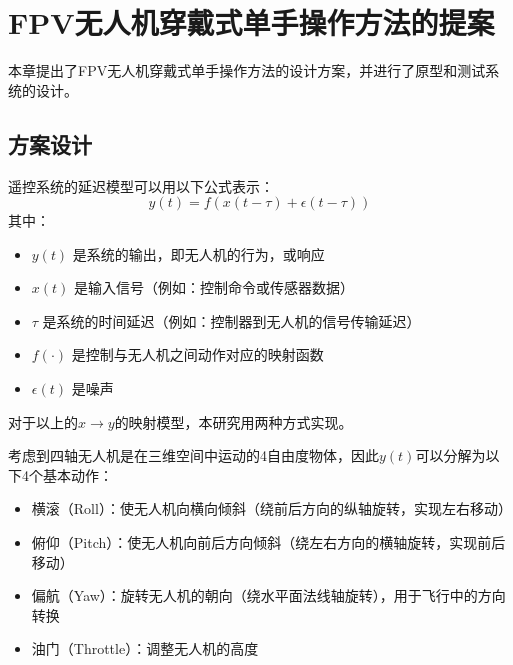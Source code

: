 \ifx\allfiles\undefined


\else
\fi

\section{FPV无人机穿戴式单手操作方法的提案}

本章提出了FPV无人机穿戴式单手操作方法的设计方案，并进行了原型和测试系统的设计。

\subsection{方案设计}\label{label:section2.1}

遥控系统的延迟模型可以用以下公式表示：
\begin{equation}
    \label{formula:2.1}
    y(t)=f(x(t-\tau)+\epsilon(t-\tau))
\end{equation}
其中：

\begin{itemize}
    \item $y(t)$ 是系统的输出，即无人机的行为，或响应
    \item $x(t)$ 是输入信号（例如：控制命令或传感器数据）
    \item $\tau$ 是系统的时间延迟（例如：控制器到无人机的信号传输延迟）
    \item $f(\cdot)$ 是控制与无人机之间动作对应的映射函数
    \item $\epsilon(t)$ 是噪声
\end{itemize}

对于以上的$x\xrightarrow{}y$的映射模型，本研究用两种方式实现。

考虑到四轴无人机是在三维空间中运动的4自由度物体，因此$y(t)$可以分解为以下4个基本动作：
\begin{itemize}
    \item 横滚（Roll）：使无人机向横向倾斜（绕前后方向的纵轴旋转，实现左右移动）
    \item 俯仰（Pitch）：使无人机向前后方向倾斜（绕左右方向的横轴旋转，实现前后移动）
    \item 偏航（Yaw）：旋转无人机的朝向（绕水平面法线轴旋转），用于飞行中的方向转换
    \item 油门（Throttle）：调整无人机的高度
\end{itemize}

